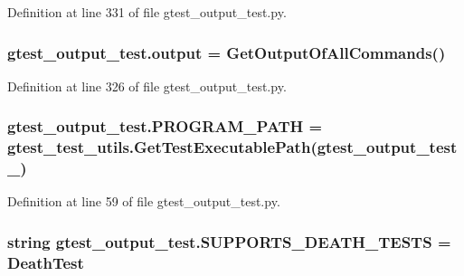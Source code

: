 Definition at line 331 of file gtest\+\_\+output\+\_\+test.\+py.

\subsubsection[{\texorpdfstring{output}{output}}]{\setlength{\rightskip}{0pt plus 5cm}gtest\+\_\+output\+\_\+test.\+output = {\bf Get\+Output\+Of\+All\+Commands}()}\hypertarget{namespacegtest__output__test_a1984d02025db23de921254c2f2638dbb}{}\label{namespacegtest__output__test_a1984d02025db23de921254c2f2638dbb}


Definition at line 326 of file gtest\+\_\+output\+\_\+test.\+py.

\subsubsection[{\texorpdfstring{P\+R\+O\+G\+R\+A\+M\+\_\+\+P\+A\+TH}{PROGRAM_PATH}}]{\setlength{\rightskip}{0pt plus 5cm}gtest\+\_\+output\+\_\+test.\+P\+R\+O\+G\+R\+A\+M\+\_\+\+P\+A\+TH = {\bf gtest\+\_\+test\+\_\+utils.\+Get\+Test\+Executable\+Path}(\textquotesingle{}gtest\+\_\+output\+\_\+test\+\_\+\textquotesingle{})}\hypertarget{namespacegtest__output__test_a92a4b0bd0a29b350050d03bccb125f60}{}\label{namespacegtest__output__test_a92a4b0bd0a29b350050d03bccb125f60}


Definition at line 59 of file gtest\+\_\+output\+\_\+test.\+py.

\subsubsection[{\texorpdfstring{S\+U\+P\+P\+O\+R\+T\+S\+\_\+\+D\+E\+A\+T\+H\+\_\+\+T\+E\+S\+TS}{SUPPORTS_DEATH_TESTS}}]{\setlength{\rightskip}{0pt plus 5cm}string gtest\+\_\+output\+\_\+test.\+S\+U\+P\+P\+O\+R\+T\+S\+\_\+\+D\+E\+A\+T\+H\+\_\+\+T\+E\+S\+TS = \textquotesingle{}Death\+Test\textquotesingle{}}\hypertarget{namespacegtest__output__test_a401e837dae10d6c728bd74684884a77f}{}\label{namespacegtest__output__test_a401e837dae10d6c728bd74684884a77f}


